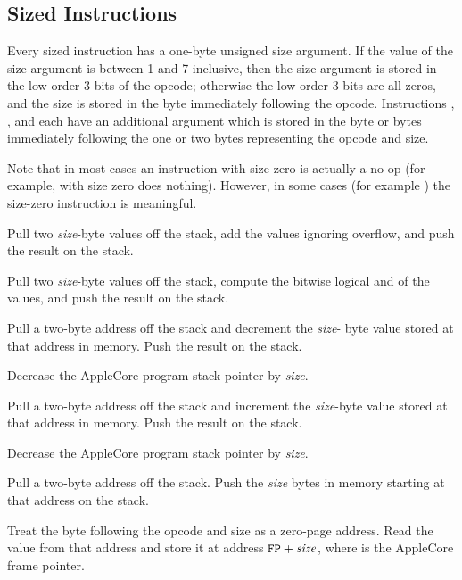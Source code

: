 \documentclass[10pt]{article}
\begin{document}
\subsection{Sized Instructions}

Every sized instruction has a one-byte unsigned size argument.  If the
value of the size argument is between 1 and 7 inclusive, then the size
argument is stored in the low-order 3 bits of the opcode; otherwise
the low-order 3 bits are all zeros, and the size is stored in the byte
immediately following the opcode.  Instructions , ,
and  each have an additional argument which is stored in the
byte or bytes immediately following the one or two bytes representing
the opcode and size.

Note that in most cases an instruction with size zero is actually a
no-op (for example,  with size zero does nothing).  However,
in some cases (for example ) the size-zero instruction is
meaningful.

 Pull two \emph{size}-byte
values off the stack, add the values ignoring overflow, and push the
result on the stack.

 Pull two
\emph{size}-byte values off the stack, compute the bitwise logical and
of the values, and push the result on the stack.

 Pull a two-byte
address off the stack and decrement the \emph{size}- byte value stored
at that address in memory.  Push the result on the stack.

Decrease the AppleCore program stack pointer by \emph{size}.

 Pull a two-byte address
off the stack and increment the \emph{size}-byte value stored at that
address in memory.  Push the result on the stack.

Decrease the AppleCore program stack pointer by \emph{size}.

Pull a two-byte address off the stack. Push the \emph{size}
bytes in memory starting at that address on the stack.

Treat the byte following the opcode and size as a zero-page
address.  Read the value from that address and store it
at address $\texttt{FP}+\mbox{\textit{size}}$, where  is the
AppleCore frame pointer.
\end{document}
